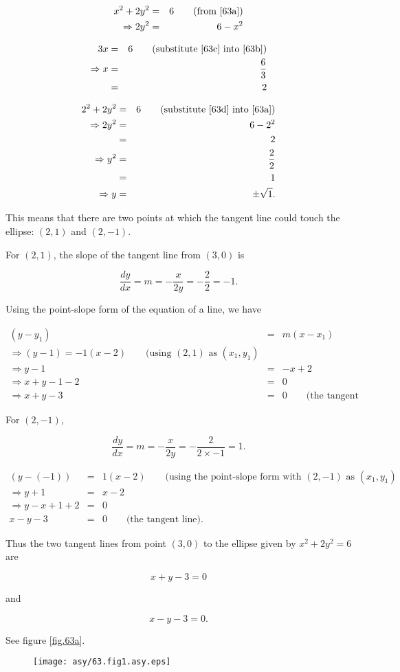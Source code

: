\begin{eqnarray}
	x^2+2y^2&=&6\qquad\mbox{(from \ref{63a})}\nonumber\\
	\Rightarrow2y^2&=&6-x^2\label{63c}
\end{eqnarray}

\begin{eqnarray}
	3x&=&6\qquad\mbox{(substitute \ref{63c} into \ref{63b})}\nonumber\\
	\Rightarrow x&=&\frac{6}{3}\label{63d}\\
	&=&2\nonumber
\end{eqnarray}

\begin{eqnarray*}
	2^2+2y^2&=&6\qquad\mbox{(substitute \ref{63d} into \ref{63a})}\\
	\Rightarrow2y^2&=&6-2^2\\
	&=&2\\
	\Rightarrow y^2&=&\frac{2}{2}\\
	&=&1\\
	\Rightarrow y&=&\pm\sqrt{1}.
\end{eqnarray*}

This means that there are two points at which the tangent line could touch the ellipse: $\left(2,1\right)$ and $\left(2,-1\right)$.

For $\left(2,1\right)$, the slope of the tangent line from $\left(3,0\right)$ is

\[\frac{dy}{dx}=m=-\frac{x}{2y}=-\frac{2}{2}=-1.\]

Using the point-slope form of the equation of a line, we have

\begin{eqnarray*}
    \left(y-y_1\right)&=&m\left(x-x_1\right)\\
    \Rightarrow\left(y-1\right)=-1\left(x-2\right)\qquad\mbox{(using }\left(2,1\right)\mbox{ as }\left(x_1,y_1\right)\\
    \Rightarrow y-1&=&-x+2\\
    \Rightarrow x+y-1-2&=&0\\
    \Rightarrow x+y-3&=&0\qquad\mbox{(the tangent line).}
\end{eqnarray*}

For $\left(2,-1\right)$,

\[\frac{dy}{dx}=m=-\frac{x}{2y}=-\frac{2}{2\times-1}=1.\]

\begin{eqnarray*}
    \left(y-\left(-1\right)\right)&=&1\left(x-2\right)\qquad\mbox{(using the point-slope form with }\left(2,-1\right)\mbox{ as }\left(x_1,y_1\right)\\
    \Rightarrow y+1&=&x-2\\
    \Rightarrow y-x+1+2&=&0\\
    x-y-3&=&0\qquad\mbox{(the tangent line).}
\end{eqnarray*}

Thus the two tangent lines from point $\left(3,0\right)$ to the ellipse given by $x^2+2y^2=6$ are

\[x+y-3=0\]

and

\[x-y-3=0.\]

See figure \vref{fig.63a}.

\begin{figure}\caption{}\begin{center}\label{fig.63a}\texttt{[image: asy/63.fig1.asy.eps]}\end{center}\end{figure}

